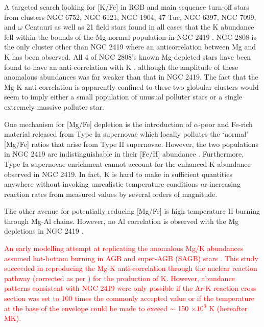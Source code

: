 \documentclass[a4paper,fleqn,usenatbib]{mnras}
\newcommand{\todo}[1]{\textcolor{red}{#1}}
\begin{document}
A targeted search looking for [K/Fe] in RGB and main sequence turn-off stars from clusters NGC 6752, NGC 6121, NGC 1904, 47 Tuc, NGC 6397, NGC 7099, and $\omega$ Centauri as well as 21 field stars found in all cases  that the K abundance fell within the bounds of the Mg-normal population in NGC 2419 \citep{carretta2013}. NGC 2808 is the only cluster other than NGC 2419 where an anticorrelation between Mg and K has been observed. All 4 of NGC 2808's known Mg-depleted stars have been found to have an anti-correlation with K \citep{mucciarelli2015}, although the amplitude of these anomalous abundances was far weaker than that in NGC 2419. The fact that the Mg-K anti-correlation is apparently confined to these two globular clusters would seem to imply either a small population of unusual polluter stars or a single extremely massive polluter star.

One  mechanism for [Mg/Fe] depletion is the introduction of $\alpha$-poor and Fe-rich material released from Type Ia supernovae \citep{tsujimoto2012first} which locally pollutes the `normal' [Mg/Fe] ratios that arise from Type II supernovae. However, the two populations in NGC 2419 are indistinguishable in their [Fe/H] abundance \citep{cohenkirby2012}. Furthermore, Type Ia supernovae enrichment cannot account for the enhanced K abundance observed in NGC 2419. In fact, K is hard to make in sufficient quantities anywhere without invoking unrealistic temperature conditions or increasing reaction rates from measured values by several orders of magnitude.

The other avenue for potentially reducing [Mg/Fe] is high temperature H-burning through Mg-Al chains. However, no Al correlation is observed with the Mg depletions in NGC 2419 \citep{cohenkirby2012,mucciarelli2012}.



\todo{An early modelling attempt at replicating the anomalous Mg/K abundances assumed hot-bottom burning in AGB and super-AGB (SAGB) stars \citep{ventura2012}. This study succeeded in reproducing the Mg-K anti-correlation through the nuclear reaction pathway \ce{^{36}Ar(p,\gamma)^{37}K(\beta ^+ \nu)^{37}Ar(e^-,\nu)^{37}Cl(p,\gamma)^{38}Ar(p,\gamma)^39K} (corrected as per \cite{iliadis2016}) for the production of K. However, abundance patterns consistent with NGC 2419 were only possible if the Ar-K reaction cross section was set to 100 times the commonly accepted value or if the temperature at the base of the envelope could be made to exceed $\sim$ 150 $\times 10^6$ K (hereafter MK).}
\end{document}
